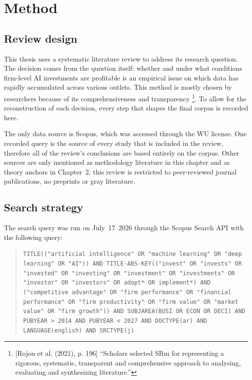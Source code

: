 \chapter{Method}
\label{sec:method}

\section{Review design}

This thesis uses a systematic literature review to address its research question. The decision comes from the question itself: whether and under what conditions firm-level AI investments are profitable is an empirical issue on which data has rapidly accumulated across various outlets. This method is mostly chosen by researchers because of its comprehensiveness and transparency \parencite[p.~196]{rojon2021utilization}\footnote{[Rojon et al. (2021), p. 196] ``Scholars selected SRm for representing a rigorous, systematic, transparent and comprehensive approach to analysing, evaluating and synthesizing literature.''}. To allow for the reconstruction of each decision, every step that shapes the final corpus is recorded here.

The only data source is Scopus, which was accessed through the WU license. One recorded query is the source of every study that is included in the review, therefore all of the review's conclusions are based entirely on the corpus. Other sources are only mentioned as methodology literature in this chapter and as theory anchors in Chapter~2, this review is restricted to peer-reviewed journal publications, no preprints or gray literature.

\section{Search strategy}

The search query was run on July~17~2026 through the Scopus Search API with the following query:

\begin{quote}\small\raggedright
\texttt{TITLE(("artificial intelligence" OR "machine learning" OR "deep
learning" OR "AI")) AND TITLE-ABS-KEY(("invest" OR "invests" OR "invested" OR
"investing" OR "investment" OR "investments" OR "investor" OR "investors" OR
adopt* OR implement*) AND ("competitive advantage" OR "firm performance" OR
"financial performance" OR "firm productivity" OR "firm value" OR "market
value" OR "firm growth")) AND SUBJAREA(BUSI OR ECON OR DECI) AND PUBYEAR > 2014
AND PUBYEAR < 2027 AND DOCTYPE(ar) AND LANGUAGE(english) AND SRCTYPE(j)}
\end{quote}

